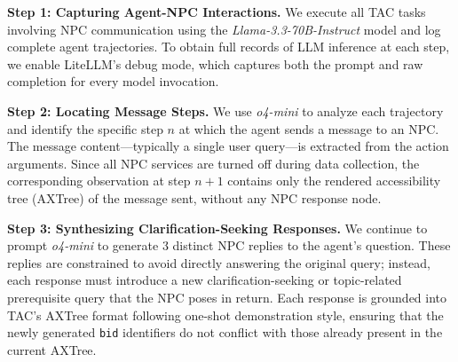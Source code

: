 \textbf{Step 1: Capturing Agent-NPC Interactions.}  
We execute all TAC tasks involving NPC communication using the \textit{Llama-3.3-70B-Instruct} model and log complete agent trajectories. To obtain full records of LLM inference at each step, we enable LiteLLM's debug mode, which captures both the prompt and raw completion for every model invocation.


\textbf{Step 2: Locating Message Steps.}  
We use \textit{o4-mini} to analyze each trajectory and identify the specific step $n$ at which the agent sends a message to an NPC. The message content---typically a single user query---is extracted from the action arguments. Since all NPC services are turned off during data collection, the corresponding observation at step $n+1$ contains only the rendered accessibility tree (AXTree) of the message sent, without any NPC response node.


\textbf{Step 3: Synthesizing Clarification-Seeking Responses.}  
We continue to prompt \textit{o4-mini} to generate 3 distinct NPC replies to the agent's question. These replies are constrained to avoid directly answering the original query; instead, each response must introduce a new clarification-seeking or topic-related prerequisite query that the NPC poses in return. Each response is grounded into TAC's AXTree format following one-shot demonstration style, ensuring that the newly generated \texttt{bid} identifiers do not conflict with those already present in the current AXTree.

